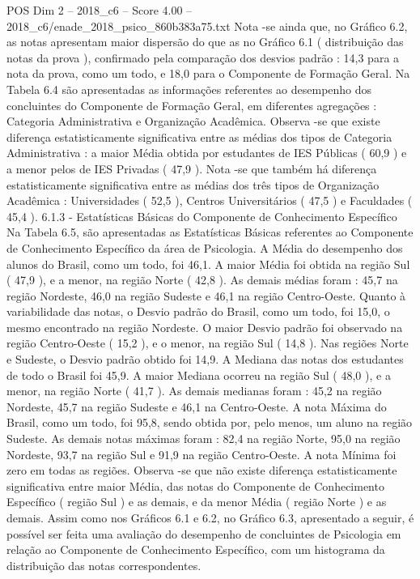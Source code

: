 \begin{textsample}{POS Dim 2 – 2018\_c6 – Score 4.00 – 2018\_c6/enade\_2018\_psico\_860b383a75.txt}
Nota -se ainda que, no Gráfico 6.2, as notas apresentam maior dispersão do que as no Gráfico 6.1 ( distribuição das notas da prova ), confirmado pela comparação dos desvios padrão : 14,3 para a nota da prova, como um todo, e 18,0 para o Componente de Formação Geral.
Na Tabela 6.4 são apresentadas as informações referentes ao desempenho dos concluintes do Componente de Formação Geral, em diferentes agregações : Categoria Administrativa e Organização Acadêmica.
Observa -se que existe diferença estatisticamente significativa entre as médias dos tipos de Categoria Administrativa : a maior Média obtida por estudantes de IES Públicas ( 60,9 ) e a menor pelos de IES Privadas ( 47,9 ).
Nota -se que também há diferença estatisticamente significativa entre as médias dos três tipos de Organização Acadêmica : Universidades ( 52,5 ), Centros Universitários ( 47,5 ) e Faculdades ( 45,4 ). 6.1.3 - Estatísticas Básicas do Componente de Conhecimento Específico Na Tabela 6.5, são apresentadas as Estatísticas Básicas referentes ao Componente de Conhecimento Específico da área de Psicologia.
A Média do desempenho dos alunos do Brasil, como um todo, foi 46,1.
A maior Média foi obtida na região Sul ( 47,9 ), e a menor, na região Norte ( 42,8 ).
As demais médias foram : 45,7 na região Nordeste, 46,0 na região Sudeste e 46,1 na região Centro-Oeste.
Quanto à variabilidade das notas, o Desvio padrão do Brasil, como um todo, foi 15,0, o mesmo encontrado na região Nordeste.
O maior Desvio padrão foi observado na região Centro-Oeste ( 15,2 ), e o menor, na região Sul ( 14,8 ).
Nas regiões Norte e Sudeste, o Desvio padrão obtido foi 14,9.
A Mediana das notas dos estudantes de todo o Brasil foi 45,9.
A maior Mediana ocorreu na região Sul ( 48,0 ), e a menor, na região Norte ( 41,7 ).
As demais medianas foram : 45,2 na região Nordeste, 45,7 na região Sudeste e 46,1 na Centro-Oeste.
A nota Máxima do Brasil, como um todo, foi 95,8, sendo obtida por, pelo menos, um aluno na região Sudeste.
As demais notas máximas foram : 82,4 na região Norte, 95,0 na região Nordeste, 93,7 na região Sul e 91,9 na região Centro-Oeste.
A nota Mínima foi zero em todas as regiões.
Observa -se que não existe diferença estatisticamente significativa entre maior Média, das notas do Componente de Conhecimento Específico ( região Sul ) e as demais, e da menor Média ( região Norte ) e as demais.
Assim como nos Gráficos 6.1 e 6.2, no Gráfico 6.3, apresentado a seguir, é possível ser feita uma avaliação do desempenho de concluintes de Psicologia em relação ao Componente de Conhecimento Específico, com um histograma da distribuição das notas correspondentes.

\end{textsample}
